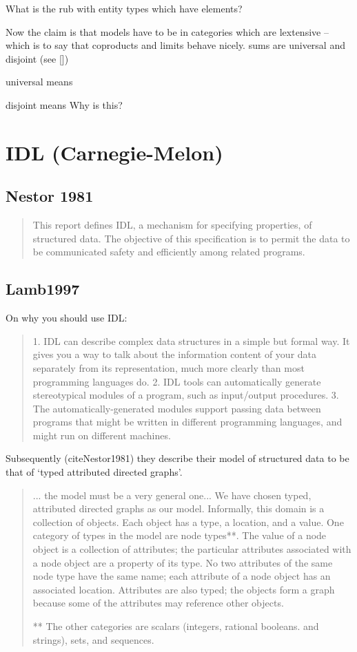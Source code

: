 \documentclass[10pt,a4paper]{scrartcl}
\newcommand{\displaybibentry}[1]
{\begin{framed}
\bibentry{#1}
\end{framed}
}
\begin{document}
What is the rub with entity types which have elements?

Now the claim is that models have to be in categories which are lextensive -- which is to say
that coproducts and limits behave nicely. sums are universal and disjoint (see [\cite {Carboni1993}])

universal means

disjoint means 
Why is this?

\section{IDL (Carnegie-Melon)}

\subsection{Nestor 1981}
\displaybibentry{Nestor1981}

\begin{quote}
This report defines IDL, a mechanism for specifying properties, of structured data. The objective of this
specification is to permit the data to be communicated safety and efficiently among related programs.
\end{quote}

\subsection{Lamb1997}
\displaybibentry{Lamb1997}
On why you should use IDL:
\begin{quote}
1. IDL can describe complex data structures in a simple but formal way.
It gives you a way to talk about the information content of your data
separately from its representation, much more clearly than most programming 
languages do.
2. IDL tools can automatically generate stereotypical modules of a program,
such as input/output procedures.
3. The automatically-generated modules support passing data between programs 
that might be written in different programming languages, and
might run on different machines.
\end{quote}

Subsequently (cite{Nestor1981}) they describe their model of structured data to be that of `typed attributed directed graphs'. 

\begin{quote}
... the
model must be a very general one... We have
chosen typed, attributed directed graphs as our model. Informally, this domain is a collection of objects.
Each object has a type, a location, and a value. One category of types in the model are node types**. The value
of a node object is a collection of attributes; the particular attributes associated with a node object are a
property of its type. No two attributes of the same node type have the same name; each attribute of a node
object has an associated location. Attributes are also typed; the objects form a graph because some of the
attributes may reference other objects.

** The other categories are scalars (integers, rational booleans. and strings), sets, and sequences.
\end{quote}
\end{document}
